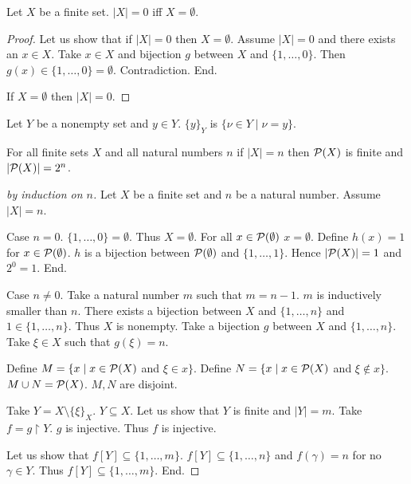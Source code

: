 \documentclass{article}
\newcommand{\Seq}[2]{\{#1,\dots,#2\}}
\newcommand{\pow}{{\cal P}}
\newcommand{\sset}[2]{\{#1\}_{#2}}
\begin{document}
  \begin{forthel}

  \begin{lemma}
  Let $X$ be a finite set.
  $|X| = 0$ iff $X = \emptyset$.
  \end{lemma}
  \begin{proof}
  Let us show that if $|X| = 0$ then $X = \emptyset$.
    Assume $|X| = 0$ and there exists an $x \in X$.
    Take $x \in X$ and bijection $g$ between $X$ and $\Seq{1}{0}$. Then $g(x) \in \Seq{1}{0} = \emptyset$. Contradiction. End.

  If $X = \emptyset$ then $|X| = 0$.
  \end{proof}


  \begin{definition}
  Let $Y$ be a nonempty set and $y \in Y$.
  $\sset{y}{Y}$ is $\{\nu \in Y \mid \nu=y \}$.
  \end{definition}

  \begin{theorem}
  For all finite sets $X$ and all natural numbers $n$ if $|X| = n$ then
  $\pow(X)$ is finite and $|\pow(X)| = 2^{n}$.
  \end{theorem}
  \begin{proof}[by induction on $n$]
  Let $X$ be a finite set and $n$ be a natural number. Assume $|X| = n$.

  Case $n = 0$. $\Seq{1}{0} = \emptyset$. Thus $X = \emptyset$.
    For all $x \in \pow(\emptyset)$ $x = \emptyset$.
    Define $h(x) = 1$ for $x \in \pow(\emptyset)$.
    $h$ is a bijection between $\pow(\emptyset)$ and $\Seq{1}{1}$.
    Hence $|\pow(X)| = 1$ and $2^{0} = 1$. End.

  Case $n \neq 0$. Take a natural number $m$ such that $m = n - 1$. $m$ is inductively smaller than $n$.
    There exists a bijection between $X$ and $\Seq{1}{n}$ and $1 \in \Seq{1}{n}$. Thus $X$ is nonempty.
    Take a bijection $g$ between $X$ and $\Seq{1}{n}$. Take $\xi \in X$ such that $g(\xi) = n$.

    Define $M = \{x \mid x \in \pow(X)$ and $\xi \in x\}$. Define $N = \{x \mid x \in \pow(X)$ and $\xi \notin x\}$.
    $M \cup N = \pow(X)$. $M,N$ are disjoint.

    Take $Y = X \setminus \sset{\xi}{X}$. $Y \subseteq X$.
    Let us show that $Y$ is finite and $|Y| = m$.
      Take $f = g \upharpoonright Y$.
      $g$ is injective. Thus $f$ is injective.

      Let us show that $f[Y] \subseteq \Seq{1}{m}$.
        $f[Y] \subseteq \Seq{1}{n}$ and $f(\gamma) = n$ for no $\gamma \in Y$.
        Thus $f[Y] \subseteq \Seq{1}{m}$. End.


\end{proof}
\end{forthel}
\end{document}
